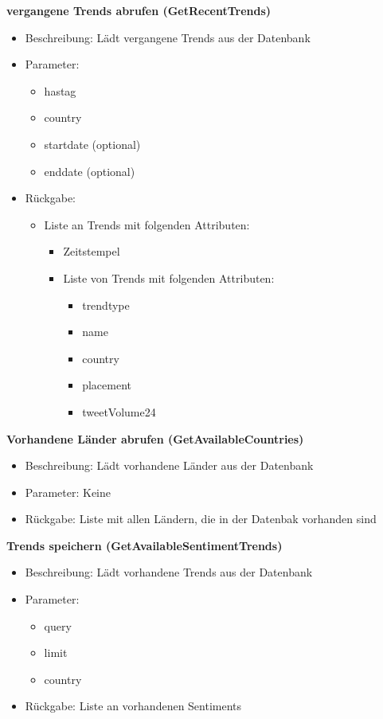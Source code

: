 \documentclass[conference]{IEEEtran}
\begin{document}
\smallskip
\textbf{vergangene Trends abrufen (GetRecentTrends)}
\begin{itemize}
    \item Beschreibung: Lädt vergangene Trends aus der Datenbank
    \item Parameter:
          \begin{itemize}
              \item hastag
              \item country
              \item startdate (optional)
              \item enddate (optional)
          \end{itemize}
    \item Rückgabe:
          \begin{itemize}
              \item Liste an Trends mit folgenden Attributen:
                    \begin{itemize}
                        \item Zeitstempel
                        \item Liste von Trends mit folgenden Attributen:
                              \begin{itemize}
                                  \item trendtype
                                  \item name
                                  \item country
                                  \item placement
                                  \item tweetVolume24
                              \end{itemize}
                    \end{itemize}
          \end{itemize}
\end{itemize}

\smallskip
\textbf{Vorhandene Länder abrufen (GetAvailableCountries)}
\begin{itemize}
    \item Beschreibung: Lädt vorhandene Länder aus der Datenbank
    \item Parameter: Keine
    \item Rückgabe: Liste mit allen Ländern, die in der Datenbak vorhanden sind
\end{itemize}

\smallskip
\textbf{Trends speichern (GetAvailableSentimentTrends)}
\begin{itemize}
    \item Beschreibung: Lädt vorhandene Trends aus der Datenbank
    \item Parameter:
          \begin{itemize}
              \item query
              \item limit
              \item country
          \end{itemize}
    \item Rückgabe: Liste an vorhandenen Sentiments
\end{itemize}
\end{document}
